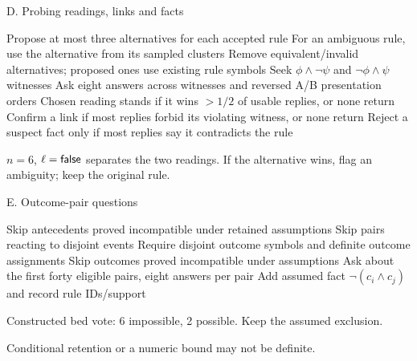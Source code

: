 \documentclass[aspectratio=169,11pt]{beamer}
\begin{document}
\begin{frame}[noframenumbering,label=app-d]{D. Probing readings, links and facts}
\backuptext
\begin{algorithmic}[1]
\State Propose at most three alternatives for each accepted rule
\State For an ambiguous rule, use the alternative from its sampled clusters
\State Remove equivalent/invalid alternatives; proposed ones use existing rule symbols
\State Seek $\phi\land\neg\psi$ and $\neg\phi\land\psi$ witnesses
\State Ask eight answers across witnesses and reversed A/B presentation orders
\State Chosen reading stands if it wins $>1/2$ of usable replies, or none return
\State Confirm a link if most replies forbid its violating witness, or none return
\State Reject a suspect fact only if most replies say it contradicts the rule
\end{algorithmic}
\vspace{2mm}
$n=6$, $\ell=\mathsf{false}$ separates the two readings. If the alternative wins, flag an ambiguity; keep the original rule.\par\vspace{0.25mm}
\end{frame}

\begin{frame}[noframenumbering,label=app-e]{E. Outcome-pair questions}
\backuptext
\begin{algorithmic}[1]
 \State Skip antecedents proved incompatible under retained assumptions
 \State Skip pairs reacting to disjoint events
 \State Require disjoint outcome symbols and definite outcome assignments
 \State Skip outcomes proved incompatible under assumptions
\EndFor
\State Ask about the first forty eligible pairs, eight answers per pair
  \State Add assumed fact $\neg(c_i\land c_j)$ and record rule IDs/support
 \EndIf
\EndFor
\end{algorithmic}
\vspace{2mm}
Constructed bed vote: 6 impossible, 2 possible. Keep the assumed exclusion.\par
Conditional retention or a numeric bound may not be definite.\par\vspace{0.25mm}
\end{frame}
\end{document}
